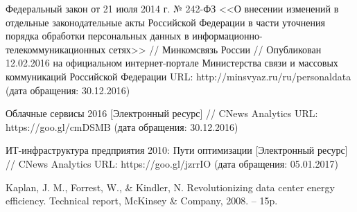 \begin{thebibliography}{00}
    Федеральный закон от 21 июля 2014 г. № 242-ФЗ <<О внесении изменений в отдельные законодательные акты Российской Федерации в части уточнения порядка обработки персональных данных в информационно-телекоммуникационных сетях>> //
    Минкомсвязь России //
    Опубликован 12.02.2016 на официальном интернет-портале Министерства связи и массовых коммуникаций Российской Федерации
    URL: http://minsvyaz.ru/ru/personaldata
    (дата обращения: 30.12.2016)

    Облачные сервисы 2016
    [Электронный ресурс] //
    CNews Analytics
    URL: https://goo.gl/cmDSMB
    (дата обращения: 30.12.2016)

    ИТ-инфраструктура предприятия 2010: Пути оптимизации
    [Электронный ресурс] //
    CNews Analytics
    URL: https://goo.gl/jzrrIO
    (дата обращения: 05.01.2017)

    Kaplan, J. M., Forrest, W., \& Kindler, N.
    Revolutionizing data center energy efficiency.
    Technical report, McKinsey \& Company, 2008. -- 15p.

\end{thebibliography}
\endgroup

\clearpage
